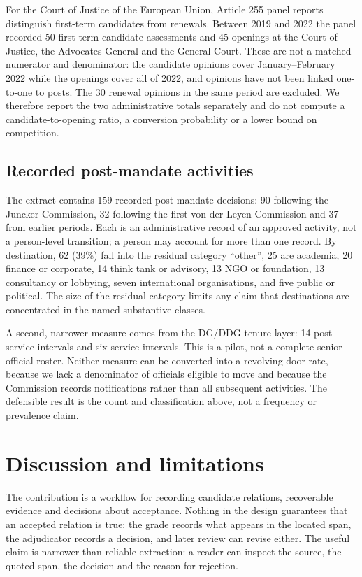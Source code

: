 \documentclass[11pt,a4paper]{article}
\begin{document}
For the Court of Justice of the European Union, Article 255 panel reports distinguish first-term candidates from renewals. Between 2019 and 2022 the panel recorded 50 first-term candidate assessments and 45 openings at the Court of Justice, the Advocates General and the General Court. These are not a matched numerator and denominator: the candidate opinions cover January--February 2022 while the openings cover all of 2022, and opinions have not been linked one-to-one to posts. The 30 renewal opinions in the same period are excluded. We therefore report the two administrative totals separately and do not compute a candidate-to-opening ratio, a conversion probability or a lower bound on competition.

\subsection{Recorded post-mandate activities}

The extract contains 159 recorded post-mandate decisions: 90 following the Juncker Commission, 32 following the first von der Leyen Commission and 37 from earlier periods. Each is an administrative record of an approved activity, not a person-level transition; a person may account for more than one record. By destination, 62 (39\%) fall into the residual category ``other'', 25 are academia, 20 finance or corporate, 14 think tank or advisory, 13 NGO or foundation, 13 consultancy or lobbying, seven international organisations, and five public or political. The size of the residual category limits any claim that destinations are concentrated in the named substantive classes.

A second, narrower measure comes from the DG/DDG tenure layer: 14 post-service intervals and six service intervals. This is a pilot, not a complete senior-official roster. Neither measure can be converted into a revolving-door rate, because we lack a denominator of officials eligible to move and because the Commission records notifications rather than all subsequent activities. The defensible result is the count and classification above, not a frequency or prevalence claim.

\section{Discussion and limitations}

The contribution is a workflow for recording candidate relations, recoverable evidence and decisions about acceptance. Nothing in the design guarantees that an accepted relation is true: the grade records what appears in the located span, the adjudicator records a decision, and later review can revise either. The useful claim is narrower than reliable extraction: a reader can inspect the source, the quoted span, the decision and the reason for rejection.
\end{document}
